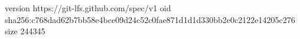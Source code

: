 version https://git-lfs.github.com/spec/v1
oid sha256:c768dad62b7bb58e4bce09d24c52c0fae871d1d1d330bb2e0c2122e14205c276
size 244345
